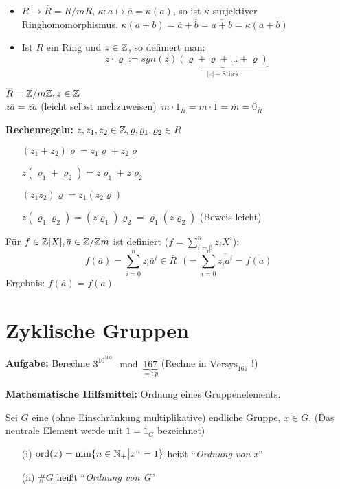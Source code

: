 \documentclass[a4paper,DIV15,BCOR12mm]{article}
\begin{document}
\begin{bemerkung}
    \text{ }
    \begin{itemize}
        \item $R \to \overline R = R/mR$, $\kappa: a \mapsto \overline a = \kappa(a)$, so ist $\kappa$ surjektiver Ringhomomorphismus. $\kappa(a+b) = \overline a + \overline b = \overline{a+b} = \kappa(a+b)$
        \item Ist $R$ ein Ring und $z \in \mathbb{Z}$, so definiert man:
            \[z \cdot \varrho := sgn(z)\underbrace{(\varrho + \varrho + ... + \varrho)}_{|z|-\text{Stück}}\]
    \end{itemize}
\end{bemerkung}

\begin{beispiel}
    $\overline R = \mathbb{Z}/m\mathbb{Z}, z \in \mathbb{Z}$\\
    $z\overline a = \overline{za}$ (leicht selbst nachzuweisen)\
    $m \cdot 1_{\overline R} = m \cdot \overline 1 = \overline m = 0_{\overline R}$
\end{beispiel}

\textbf{Rechenregeln:} $z, z_1, z_2 \in \mathbb{Z}, \varrho, \varrho_1,
\varrho_2 \in R$
\begin{itemize}
    \item[] $(z_1 + z_2)\varrho = z_1\varrho + z_2\varrho$
    \item[] $z(\varrho_1 + \varrho_2) = z\varrho_1 + z\varrho_2$
    \item[] $(z_1z_2)\varrho = z_1(z_2\varrho)$
    \item[] $z(\varrho_1\varrho_2) = (z\varrho_1)\varrho_2 = \varrho_1(z\varrho_2)$ (Beweis leicht)
\end{itemize}

Für $f \in \mathbb{Z}[X], \overline a \in \mathbb{Z}/\mathbb{Z} m$ ist definiert ($f =
\sum_{i=0}^n z_iX^i$):
\[f(\overline a) = \sum_{i=0}^nz_i\overline a^i \in \overline R \text{ } (= \sum_{i=0}^n\overline{z_ia^i} = \overline{f(a)}\]
Ergebnis: $f(\overline a) = \overline{f(a)}$

\section{Zyklische Gruppen}

\textbf{Aufgabe:} Berechne $3^{10^{500}} \mod
\underbrace{167}_{=:p}$ (Rechne in $\text{Versys}_{167}$ !)

\textbf{Mathematische Hilfsmittel:} Ordnung eines Gruppenelements.

\begin{definition}
    Sei $G$ eine (ohne Einschränkung multiplikative) endliche Gruppe, $x \in G$. (Das neutrale Element werde mit $1 = 1_G$ bezeichnet)
    \begin{itemize}
        \item[(i)] $\mathop{\rm ord}\nolimits(x) = \min \{n \in \mathbb{N}_+ \big| x^n = 1\}$ heißt "`\emph{Ordnung von x}"'
        \item[(ii)] $\#G$ heißt "`\emph{Ordnung von G}"'
    \end{itemize}
\end{definition}
\end{document}
